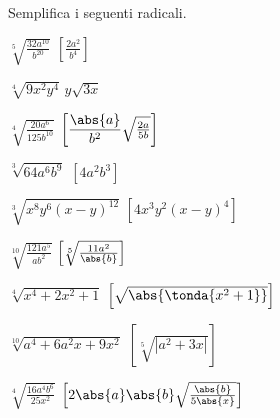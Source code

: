 \begin{esercizio}[\Ast]
 \label{ese:2.27}
Semplifica i seguenti radicali.
\vspace{-.5em}
 \begin{multicols}{2}
 \begin{enumeratea}
 \item $\sqrt[5]{\frac{32a^{10}}{b^{20}}}$
  \hfill $\left[\frac{2 a^2}{b^4}\right]$
 \item $\sqrt[4]{9x^2y^4}$
  \hfill $y\sqrt{3x}$
 \item $\sqrt[4]{\frac{20a^6}{125b^{10}}}$
  \hfill $\left[\dfrac{\abs{a}}{b^2}\sqrt{\frac{2a}{5b}}\right]$
 \item $\sqrt[3]{64a^6b^9}$
  \hfill $\left[4a^2b^3\right]$
 \item $\sqrt[3]{x^8y^6(x-y)^{12}}$
  \hfill $\left[4x^3y^2(x-y)^{4}\right]$
 \item $\sqrt[10]{\frac{121a^5}{ab^2}}$
  \hfill $\left[\sqrt[5]{\frac{11a^2}{\abs{b}}}\right]$
 \item $\sqrt[4]{x^4+2x^2+1}$
  \hfill $\left[\sqrt{\abs{\tonda{x^2+1}}}\right]$
 \item $\sqrt[10]{a^4+6a^2x+9x^2}$
  \hfill $\left[\sqrt[5]{\left|a^2+3x\right|}\right]$
 \item $\sqrt[4]{\frac{16a^4b^6}{25x^2}}$
  \hfill $\left[2 \abs{a} \abs{b} \sqrt{\frac{\abs{b}}{5 \abs{x}}}\right]$
 \end{enumeratea}
 \end{multicols}
\end{esercizio}


